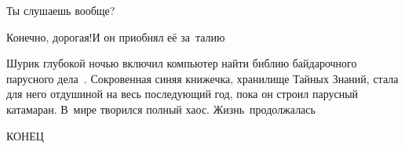 {\diagdash Ты слушаешь вообще?

\diagdash Конечно, дорогая!\mdash И он приобнял её за~талию\myldots{}




\myldots{}Шурик глубокой ночью включил компьютер найти библию байдарочного парусного дела~\cite{Перегудов}. Сокровенная синяя книжечка, хранилище Тайных Знаний, стала для него отдушиной на весь последующий год, пока он строил парусный катамаран. В~мире творился полный хаос. Жизнь~продолжалась\myldots{}


\begin{center}
\end{center}

\vspace*{-12mm}
\begin{center}
	\large {КОНЕЦ}
\end{center}

}








